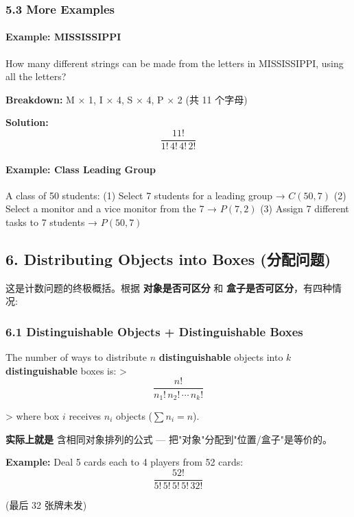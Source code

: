 \documentclass[10pt,a4paper,openany]{ctexbook}
\theoremstyle{definition}
\theoremstyle{remark}
\renewenvironment{quote}
  {\list{}{\leftmargin=1em\rightmargin=0pt\topsep=0.5pt\partopsep=0pt}\item[]}
  {\endlist}
\begin{document}
\subsubsection{5.3 More Examples}

\paragraph{Example: MISSISSIPPI}

\begin{quote}
How many different strings can be made from the letters in MISSISSIPPI, using all the letters?

\textbf{Breakdown:} M × 1, I × 4, S × 4, P × 2 (共 11 个字母)

\textbf{Solution:}
\[
\frac{11!}{1! \, 4! \, 4! \, 2!}
\]


\end{quote}

\paragraph{Example: Class Leading Group}

\begin{quote}
A class of 50 students:
(1) Select 7 students for a leading group → $C(50, 7)$
(2) Select a monitor and a vice monitor from the 7 → $P(7, 2)$
(3) Assign 7 different tasks to 7 students → $P(50, 7)$

\end{quote}
\vspace{-2pt}

\subsection{6. Distributing Objects into Boxes (分配问题)}

这是计数问题的终极概括。根据 \textbf{对象是否可区分} 和 \textbf{盒子是否可区分}，有四种情况:
\subsubsection{6.1 Distinguishable Objects + Distinguishable Boxes}

\begin{quote}
The number of ways to distribute $n$ \textbf{distinguishable} objects into $k$ \textbf{distinguishable} boxes is:
>
\[
\frac{n!}{n_1! \, n_2! \, \cdots \, n_k!}
\]

>
where box $i$ receives $n_i$ objects ($\sum n_i = n$).

\textbf{实际上就是} 含相同对象排列的公式 — 把"对象"分配到"位置/盒子"是等价的。

\textbf{Example:} Deal 5 cards each to 4 players from 52 cards:
\[
\frac{52!}{5! \, 5! \, 5! \, 5! \, 32!}
\]

(最后 32 张牌未发)

\end{quote}
\end{document}
